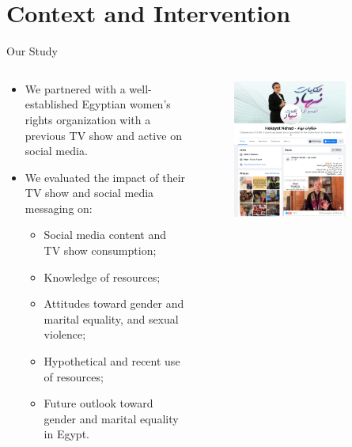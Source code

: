 \documentclass[10pt]{beamer}
\begin{document}
\section{Context and Intervention}
\begin{frame}{Our Study}
\begin{columns}[T]\begin{column}{0.6\textwidth}
\begin{itemize}
    \item We partnered with a well-established Egyptian women's rights organization with a previous TV show and active on social media. \vspace{2mm}
    \item We evaluated the impact of their TV show and social media messaging on: \vspace{2mm}
    \begin{itemize}
        \item Social media content and TV show consumption; \vspace{1mm}
        \item Knowledge of resources; \vspace{1mm}
        \item Attitudes toward gender and marital equality, and sexual violence; \vspace{1mm}
        \item Hypothetical and recent use of resources; \vspace{1mm}
        \item Future outlook toward gender and marital equality in Egypt.
    \end{itemize}
\end{itemize}
\end{column}
\begin{column}{0.5\textwidth}
\begin{figure}
\includegraphics[width = 0.8\textwidth]{Recruit_Intervention/hakayat nehad.png}\captionsetup{font=small, width = 0.9\linewidth}

\end{figure}
\end{column}
\end{columns}
\end{frame}
\end{document}
